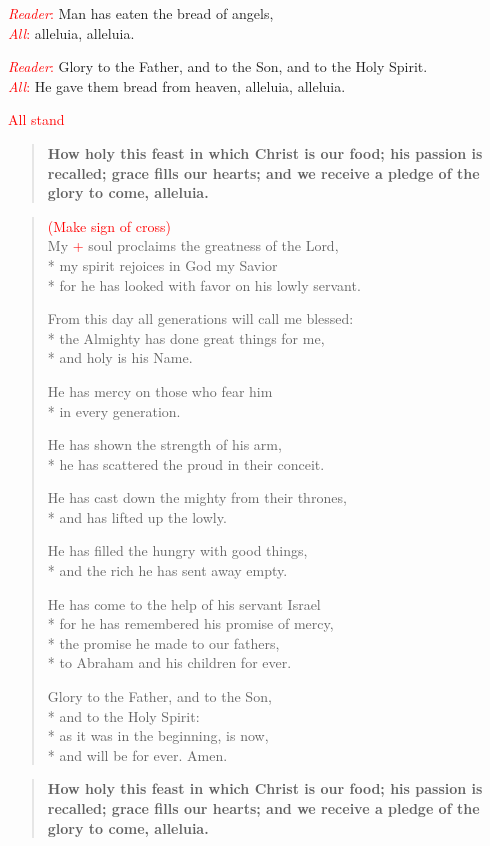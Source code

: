 \documentclass[letterpaper,14pt]{extarticle}
\newcommand{\side}[1]{\flagverse{\textcolor{red}{\textit{#1}}:}}
\newcommand{\sidestar}[1]{\textcolor{red}{\textit{#1}:}}
\newcommand{\rednote}[1]{\textcolor{red}{#1}}
\newlength{\oldindent}
\newcommand{\antiphon}[2]{
	\setlength{\oldindent}{\vindent}
	\setlength{\vindent}{0em}
	\begin{verse}
	\side{#1} \textbf{#2}
	\end{verse}
	\setlength{\vindent}{\oldindent}
}
\begin{document}
\sidestar{Reader} Man has eaten the bread of angels, \\
\sidestar{All} alleluia, alleluia.

\sidestar{Reader} Glory to the Father, and to the Son, and to the Holy Spirit. \\
\sidestar{All} He gave them bread from heaven, alleluia, alleluia.

\rednote{All stand}
\antiphon{Leader}{How holy this feast in which Christ is our food; his passion
is recalled; grace fills our hearts; and we receive a pledge of the glory to
come, alleluia.}
\setlength{\stanzaskip}{0.25\baselineskip}
\begin{verse}
\rednote{(Make sign of cross)}\\
\side{All} My \rednote{+} soul proclaims the greatness of the Lord, \\*
my spirit rejoices in God my Savior \\*
for he has looked with favor on his lowly servant.

From this day all generations will call me blessed: \\*
the Almighty has done great things for me, \\*
and holy is his Name.

He has mercy on those who fear him \\*
in every generation.

He has shown the strength of his arm, \\*
he has scattered the proud in their conceit.

He has cast down the mighty from their thrones, \\*
and has lifted up the lowly.

He has filled the hungry with good things, \\*
and the rich he has sent away empty.

He has come to the help of his servant Israel \\*
for he has remembered his promise of mercy, \\*
the promise he made to our fathers, \\*
to Abraham and his children for ever.

Glory to the Father, and to the Son, \\*
and to the Holy Spirit: \\*
as it was in the beginning, is now, \\*
and will be for ever. Amen.
\end{verse}
\setlength{\stanzaskip}{0.75\baselineskip}
\antiphon{All}{How holy this feast in which Christ is our food; his passion
is recalled; grace fills our hearts; and we receive a pledge of the glory to
come, alleluia.}
\end{document}
